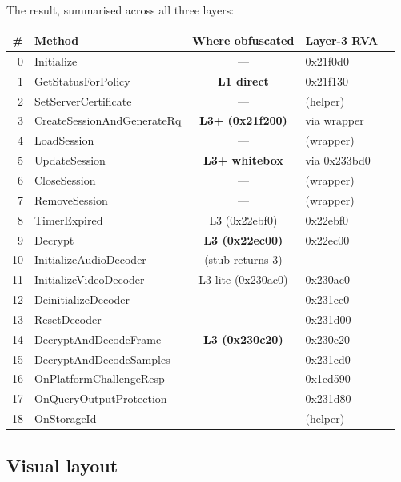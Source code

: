 \documentclass[11pt,letterpaper]{article}
\begin{document}
The result, summarised across all three layers:

\begin{center}\footnotesize
\begin{tabular}{rlclc}
\toprule
\textbf{\#} & \textbf{Method} & \textbf{Where obfuscated} & \textbf{Layer-3 RVA}\\
\midrule
0 & Initialize                 & ---                & 0x21f0d0 \\
1 & GetStatusForPolicy         & \textbf{L1 direct} & 0x21f130 \\
2 & SetServerCertificate       & ---                & (helper) \\
3 & CreateSessionAndGenerateRq & \textbf{L3+ (0x21f200)} & via wrapper \\
4 & LoadSession                & ---                & (wrapper)  \\
5 & UpdateSession              & \textbf{L3+ whitebox} & via 0x233bd0 \\
6 & CloseSession               & ---                & (wrapper)  \\
7 & RemoveSession              & ---                & (wrapper)  \\
8 & TimerExpired               & L3 (0x22ebf0)     & 0x22ebf0 \\
9 & Decrypt                    & \textbf{L3 (0x22ec00)} & 0x22ec00 \\
10 & InitializeAudioDecoder    & (stub returns 3)  & --- \\
11 & InitializeVideoDecoder    & L3-lite (0x230ac0) & 0x230ac0 \\
12 & DeinitializeDecoder       & ---               & 0x231ce0 \\
13 & ResetDecoder              & ---               & 0x231d00 \\
14 & DecryptAndDecodeFrame     & \textbf{L3 (0x230c20)} & 0x230c20 \\
15 & DecryptAndDecodeSamples   & ---               & 0x231cd0 \\
16 & OnPlatformChallengeResp   & ---               & 0x1cd590 \\
17 & OnQueryOutputProtection   & ---               & 0x231d80 \\
18 & OnStorageId               & ---               & (helper) \\
\bottomrule
\end{tabular}
\end{center}

\subsection{Visual layout}
\end{document}
